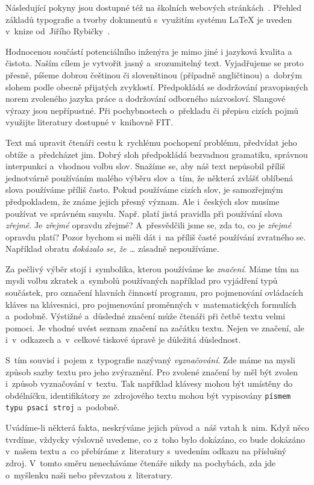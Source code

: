 Následující pokyny jsou dostupné též na školních webových stránkách~\cite{fitWeb}. Přehled základů typografie a tvorby dokumentů s~využitím systému \LaTeX{} je uveden v~knize od~Jiřího Rybičky~\cite{Rybicka}.

Hodnocenou součástí potenciálního inženýra je mimo jiné i jazyková kvalita a čistota. Naším cílem je vytvořit jasný a~srozumitelný text. Vyjadřujeme se proto přesně, píšeme dobrou češtinou či slovenštinou (případně angličtinou) a~dobrým slohem podle obecně přijatých zvyklostí. Předpokládá se dodržování pravopisných norem zvoleného jazyka práce a dodržování odborného názvosloví. Slangové výrazy jsou nepřípustné. Při pochybnostech o~překladu či přepisu cizích pojmů využijte literatury dostupné v~knihovně FIT. 

Text má upravit čtenáři cestu k~rychlému pochopení problému, předvídat jeho obtíže a~předcházet jim. Dobrý sloh předpokládá bezvadnou gramatiku, správnou interpunkci a~vhodnou volbu slov. Snažíme se, aby náš text nepůsobil příliš jednotvárně používáním malého výběru slov a~tím, že některá zvlášť oblíbená slova používáme příliš často. Pokud používáme cizích slov, je samozřejmým předpokladem, že známe jejich přesný význam. Ale i~českých slov musíme používat ve správném smyslu. Např. platí jistá pravidla při používání slova {\it zřejmě}. Je {\it zřejmé} opravdu zřejmé? A~přesvědčili jsme se, zda to, co je {\it zřejmé} opravdu platí? Pozor bychom si měli dát i~na příliš časté používání zvratného se. Například obratu {\it dokázalo se, že \ldots{}} zásadně nepoužíváme.

Za pečlivý výběr stojí i~symbolika, kterou používáme ke {\it značení}. Máme tím na mysli volbu zkratek a~symbolů používaných například pro vyjádření typů součástek, pro označení hlavních činností programu, pro pojmenování ovládacích kláves na klávesnici, pro pojmenování proměnných v~matematických formulích a~podobně. Výstižné a~důsledné značení může čtenáři při četbě textu velmi pomoci. Je vhodné uvést seznam značení na začátku textu. Nejen ve značení, ale i~v~odkazech a~v~celkové tiskové úpravě je důležitá důslednost.

S~tím souvisí i~pojem z~typografie nazývaný {\it vyznačování}. Zde máme na mysli způsob sazby textu pro jeho zvýraznění. Pro zvolené značení by měl být zvolen i~způsob vyznačování v~textu. Tak například klávesy mohou být umístěny do obdélníčku, identifikátory ze~zdrojového textu mohou být vypisovány {\tt písmem typu psací stroj} a~podobně.

Uvádíme-li některá fakta, neskrýváme jejich původ a~náš vztah k~nim. Když něco tvrdíme, vždycky výslovně uvedeme, co z~toho bylo dokázáno, co bude dokázáno v~našem textu a~co přebíráme z~literatury s~uvedením odkazu na příslušný zdroj. V~tomto směru nenecháváme čtenáře nikdy na pochybách, zda jde o~myšlenku naši nebo převzatou z~literatury.

